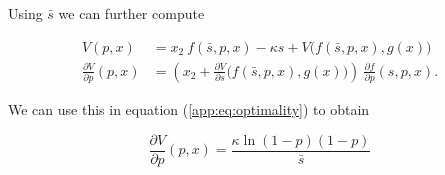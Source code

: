 \documentclass[american, abstract=on]{scrartcl}
\begin{document}
Using $\bar{s}$ we can further compute

\begin{equation}
  \begin{split}
    V(p, x) &=  x_2 \ f(\bar{s}, p, x) - \kappa s + V\Big(f(\bar{s}, p, x), g(x)\Big) \\
    \frac{\partial V}{\partial p}(p, x) &= \left(x_2 + \frac{\partial V}{\partial s}\Big(f(\bar{s}, p, x), g(x)\Big) \right) \ \frac{\partial f}{\partial p}(s, p, x).
  \end{split}
\end{equation}

We can use this in equation (\ref{app:eq:optimality}) to obtain

\begin{equation}
  \frac{\partial V}{\partial p}(p, x) = \frac{\kappa \ln(1 - p) (1 - p)}{\bar{s}}
\end{equation}
\end{document}
